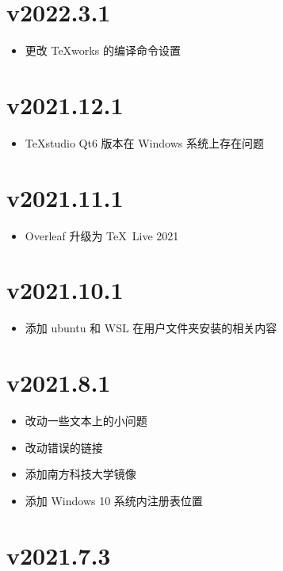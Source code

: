 \section*{v2022.3.1}

\begin{itemize}
  \item 更改 \TeX works 的编译命令设置
\end{itemize}

\section*{v2021.12.1}

\begin{itemize}
  \item \TeX studio Qt6 版本在 Windows 系统上存在问题
\end{itemize}

\section*{v2021.11.1}

\begin{itemize}
  \item Overleaf 升级为 \TeX\ Live 2021
\end{itemize}

\section*{v2021.10.1}

\begin{itemize}
  \item 添加 ubuntu 和 WSL 在用户文件夹安装的相关内容
\end{itemize}

\section*{v2021.8.1}

\begin{itemize}
  \item 改动一些文本上的小问题
  \item 改动错误的链接
  \item 添加南方科技大学镜像
  \item 添加 Windows 10 系统内注册表位置
\end{itemize}

\section*{v2021.7.3}


